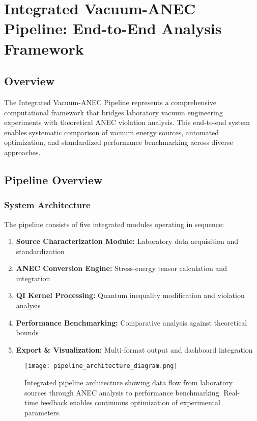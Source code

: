 \documentclass[11pt]{article}
\begin{document}
\section*{Integrated Vacuum-ANEC Pipeline: End-to-End Analysis Framework}

\subsection*{Overview}
The Integrated Vacuum-ANEC Pipeline represents a comprehensive computational framework that bridges laboratory vacuum engineering experiments with theoretical ANEC violation analysis. This end-to-end system enables systematic comparison of vacuum energy sources, automated optimization, and standardized performance benchmarking across diverse approaches.

\subsection*{Pipeline Overview}

\subsubsection*{System Architecture}
The pipeline consists of five integrated modules operating in sequence:

\begin{enumerate}
  \item \textbf{Source Characterization Module:} Laboratory data acquisition and standardization
  \item \textbf{ANEC Conversion Engine:} Stress-energy tensor calculation and integration
  \item \textbf{QI Kernel Processing:} Quantum inequality modification and violation analysis
  \item \textbf{Performance Benchmarking:} Comparative analysis against theoretical bounds
  \item \textbf{Export \& Visualization:} Multi-format output and dashboard integration
\end{enumerate}

\begin{figure}[h]
  \centering
  \texttt{[image: pipeline\_architecture\_diagram.png]}
  \caption{Integrated pipeline architecture showing data flow from laboratory sources through ANEC analysis to performance benchmarking. Real-time feedback enables continuous optimization of experimental parameters.}
  \label{fig:pipeline_architecture}
\end{figure}
\end{document}
